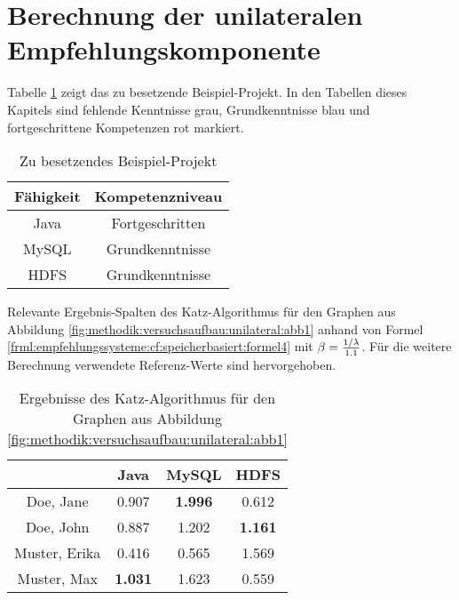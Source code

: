 \section{Berechnung der unilateralen Empfehlungskomponente}
\label{ch:nebenrechnungen:unilateral}
Tabelle \ref{tbl:berechnungDerKatzZentralitaetPseudoMitarbeiter:tbl1} zeigt das zu besetzende Beispiel-Projekt. In den Tabellen dieses Kapitels sind fehlende Kenntnisse grau, Grundkenntnisse blau und fortgeschrittene Kompetenzen rot markiert.
\begin{table}[h]
	\centering
	\begin{tabular}{c|c}
		Fähigkeit & Kompetenzniveau \\
		\hline
		Java  & \cellcolor{usercolor}Fortgeschritten\\
		MySQL & \cellcolor{itemcolor}Grundkenntnisse\\
		HDFS  & \cellcolor{itemcolor}Grundkenntnisse
	\end{tabular}
	\caption{Zu besetzendes Beispiel-Projekt}
	\label{tbl:berechnungDerKatzZentralitaetPseudoMitarbeiter:tbl1}
\end{table}

Relevante Ergebnis-Spalten des Katz-Algorithmus für den Graphen aus Abbildung \ref{fig:methodik:versuchsaufbau:unilateral:abb1} anhand von Formel \ref{frml:empfehlungssysteme:cf:speicherbasiert:formel4} mit $\beta = \frac{1/\lambda}{1.1}$. Für die weitere Berechnung verwendete Referenz-Werte sind hervorgehoben.

\begin{table}[h]
	\centering
	\begin{tabular}{c|c|c|c}
		& Java & MySQL & HDFS\\ 
		\hline
		Doe, Jane     & \cellcolor{exxetagray}0.907 & \cellcolor{itemcolor}\textbf{1.996} & \cellcolor{exxetagray}0.612\\
		Doe, John     & \cellcolor{itemcolor}0.887 & \cellcolor{itemcolor}1.202 & \cellcolor{itemcolor}\textbf{1.161}\\
		Muster, Erika & \cellcolor{exxetagray}0.416 & \cellcolor{exxetagray}0.565 & \cellcolor{usercolor}1.569\\
		Muster, Max   & \cellcolor{itemcolor}\textbf{1.031} & \cellcolor{itemcolor}1.623 & \cellcolor{exxetagray}0.559
	\end{tabular}
	\caption{Ergebnisse des Katz-Algorithmus für den Graphen aus Abbildung \ref{fig:methodik:versuchsaufbau:unilateral:abb1}}
	\label{tbl:berechnungDerKatzZentralitaetPseudoMitarbeiter:tbl2}
\end{table}


